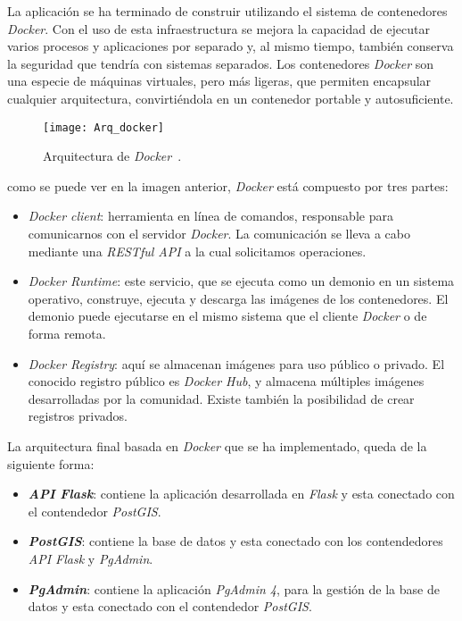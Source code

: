 La aplicación se ha terminado de construir utilizando el sistema de contenedores \emph{Docker}. Con el uso de esta infraestructura se mejora la capacidad de ejecutar varios procesos y aplicaciones por separado y, al mismo tiempo, también conserva la seguridad que tendría con sistemas separados. Los contenedores \emph{Docker} son una especie de máquinas virtuales, pero más ligeras, que permiten  encapsular cualquier arquitectura, convirtiéndola en un contenedor portable y autosuficiente. 


\begin{figure}[H]
	\centering
	\texttt{[image: Arq\_docker]}
	\caption[Arquitectura de \emph{Docker}]{Arquitectura de \emph{Docker}~\cite{arq_dock}.}
	\label{fig:Arq_docker}
\end{figure}

\noindent como se puede ver en la imagen anterior, \emph{Docker} está compuesto por tres partes:

\begin{itemize}
\item \emph{Docker client}: herramienta en línea de comandos, responsable para comunicarnos con el servidor \emph{Docker}. La comunicación se lleva a cabo mediante una \emph{RESTful API} a la cual solicitamos operaciones.

\item \emph{Docker Runtime}: este servicio, que se ejecuta como un demonio en un sistema operativo, construye, ejecuta y descarga las imágenes de los contenedores. El demonio puede ejecutarse en el mismo sistema que el cliente \emph{Docker} o de forma remota.

\item \emph{Docker Registry}: aquí se almacenan imágenes para uso público o privado. El conocido registro público es \emph{Docker Hub}, y almacena múltiples imágenes desarrolladas por la comunidad. Existe también la posibilidad de crear registros privados.

\end{itemize}

La arquitectura final basada en \emph{Docker} que se ha implementado, queda de la siguiente forma:

\begin{itemize}

\item \textbf{\emph{API Flask}}: contiene la aplicación desarrollada en \emph{Flask} y esta conectado con el contendedor \emph{PostGIS}.

\item \textbf{\emph{PostGIS}}: contiene la base de datos y esta conectado con los contendedores \emph{API Flask} y \emph{PgAdmin}.

\item \textbf{\emph{PgAdmin}}: contiene la aplicación \emph{PgAdmin 4}, para la gestión de la base de datos y esta conectado con el contendedor \emph{PostGIS}.
\end{itemize}

